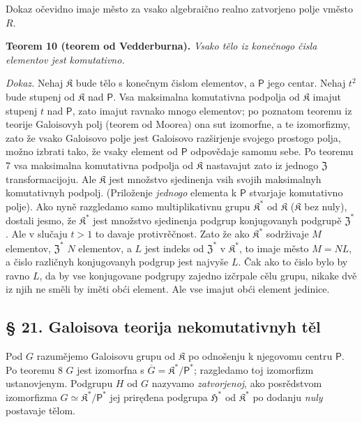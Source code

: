 \documentclass[11pt]{article}
\begin{document}
Dokaz očevidno imaje město za vsako algebraično realno zatvorjeno polje vměsto \(R\).

\textbf{Teorem 10 (teorem od Vedderburna).} \emph{Vsako tělo iz konečnogo čisla elementov jest komutativno.}

\emph{Dokaz.} Nehaj \(\mathfrak K\) bude tělo s konečnym čislom elementov, a \(\mathsf P\) jego centar. Nehaj \(t^2\) bude stupenj od \(\mathfrak K\) nad \(\mathsf P\). Vsa maksimalna komutativna podpolja od \(\mathfrak K\) imajut stupenj \(t\) nad \(\mathsf P\), zato imajut ravnako mnogo elementov; po poznatom teoremu iz teorije Galoisovyh polj (teorem od Moorea) ona sut izomorfne, a te izomorfizmy, zato že vsako Galoisovo polje jest Galoisovo razširjenje svojego prostogo polja, možno izbrati tako, že vsaky element od \(\mathsf P\) odpovědaje samomu sebe. Po teoremu 7 vsa maksimalna komutativna podpolja od \(\mathfrak K\) nastavajut zato iz jednogo \(\mathfrak Z\) transformacijoju. Ale \(\mathfrak K\) jest množstvo sjedinenja vsih svojih maksimalnyh komutativnyh podpolj. (Priloženje \emph{jednogo} elementa k \(\mathsf P\) stvarjaje komutativno polje). Ako nyně razgledamo samo multiplikativnu grupu \(\mathfrak K^*\) od \(\mathfrak K\) (\(\mathfrak K\) bez nuly), dostali jesmo, že \(\mathfrak K^*\) jest množstvo sjedinenja podgrup konjugovanyh podgrupě \(\mathfrak Z^*\). Ale v slučaju \(t>1\) to davaje protivrěčnost. Zato že ako \(\mathfrak K^*\) sodrživaje \(M\) elementov, \(\mathfrak Z^*\) \(N\) elementov, a \(L\) jest indeks od \(\mathfrak Z^*\) v \(\mathfrak K^*\), to imaje město \(M=NL\), a čislo različnyh konjugovanyh podgrup jest najvyše \(L\). Čak ako to čislo bylo by ravno \(L\), da by vse konjugovane podgrupy zajedno izčrpale cělu grupu, nikake dvě iz njih ne směli by iměti obći element. Ale vse imajut obći element jedinice.

\subsection*{§ 21. Galoisova teorija nekomutativnyh těl}\label{die-galoissche-theorie-der-nichtkommutativen-koerper}

Pod \(G\) razumějemo Galoisovu grupu od \(\mathfrak K\) po odnošenju k njegovomu centru \(\mathsf P\). Po teoremu 8 \(G\) jest izomorfna s \(\overline G=\mathfrak K^*/\mathsf P^*\); razgledamo toj izomorfizm ustanovjenym. Podgrupu \(H\) od \(G\) nazyvamo \emph{zatvorjenoj}, ako posrědstvom izomorfizma \(G\simeq\mathfrak K^*/\mathsf P^*\) jej priręđena podgrupa \(\mathfrak H^*\) od \(\mathfrak K^*\) po dodanju \emph{nuly} postavaje tělom.
\end{document}
